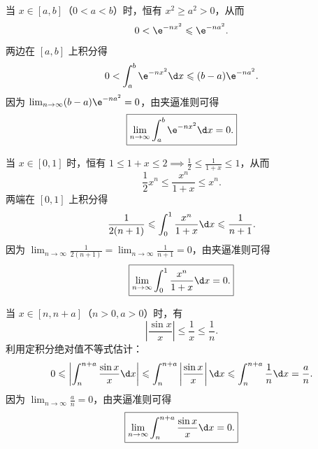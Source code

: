 \begin{solution}

    当 $x \in [a, b]$（$0 < a < b$）时，恒有 $x^2 \geqslant a^2 > 0$，从而
    \begin{equation}
        0 < \e^{-nx^2} \leqslant \e^{-na^2}.
    \end{equation}
    两边在 $[a, b]$ 上积分得
    \begin{equation}
        0 < \int_a^b \e^{-nx^2} \d x \leqslant (b - a)\e^{-na^2}.
    \end{equation}
    因为 $\lim_{n\to\infty} (b - a)\e^{-na^2} = 0$，由夹逼准则可得
    \begin{equation}
        \boxed{\lim_{n\to\infty} \int_a^b \e^{-nx^2} \d x = 0.}
    \end{equation}


    当 $x \in [0, 1]$ 时，恒有 $1 \leqslant 1 + x \leqslant 2 \implies \frac{1}{2} \leqslant \frac{1}{1+x} \leqslant 1$，从而
    \begin{equation}
        \frac{1}{2}x^n \leqslant \frac{x^n}{1 + x} \leqslant x^n.
    \end{equation}
    两端在 $[0, 1]$ 上积分得
    \begin{equation}
        \frac{1}{2(n + 1)} \leqslant \int_0^1 \frac{x^n}{1 + x} \d x \leqslant \frac{1}{n + 1}.
    \end{equation}
    因为 $\lim_{n\to\infty} \frac{1}{2(n+1)} = \lim_{n\to\infty} \frac{1}{n+1} = 0$，由夹逼准则可得
    \begin{equation}
        \boxed{\lim_{n\to\infty} \int_0^1 \frac{x^n}{1 + x} \d x = 0.}
    \end{equation}


    当 $x \in [n, n + a]$（$n > 0, a > 0$）时，有
    \begin{equation}
        \left| \frac{\sin x}{x} \right| \leqslant \frac{1}{x} \leqslant \frac{1}{n}.
    \end{equation}
    利用定积分绝对值不等式估计：
    \begin{equation}
        0 \leqslant \left| \int_n^{n+a} \frac{\sin x}{x} \d x \right| \leqslant \int_n^{n+a} \left| \frac{\sin x}{x} \right| \d x \leqslant \int_n^{n+a} \frac{1}{n} \d x = \frac{a}{n}.
    \end{equation}
    因为 $\lim_{n\to\infty} \frac{a}{n} = 0$，由夹逼准则可得
    \begin{equation}
        \boxed{\lim_{n\to\infty} \int_n^{n+a} \frac{\sin x}{x} \d x = 0.}
    \end{equation}
\end{solution}

